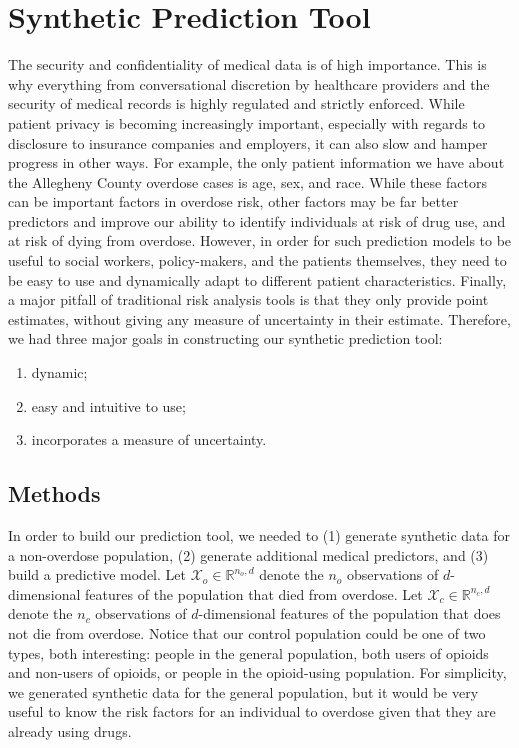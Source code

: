 \documentclass{article}
\begin{document}
\section{Synthetic Prediction Tool}
The security and confidentiality of medical data is of high importance. This is why everything from conversational discretion by healthcare providers and the security of medical records is highly regulated and strictly enforced. While patient privacy is becoming increasingly important, especially with regards to disclosure to insurance companies and employers, it can also slow and hamper progress in other ways. For example, the only patient information we have about the Allegheny County overdose cases is age, sex, and race. While these factors can be important factors in overdose risk, other factors may be far better predictors and improve our ability to identify individuals at risk of drug use, and at risk of dying from overdose. However, in order for such prediction models to be useful to social workers, policy-makers, and the patients themselves, they need to be easy to use and dynamically adapt to different patient characteristics. Finally, a major pitfall of traditional risk analysis tools is that they only provide point estimates, without giving any measure of uncertainty in their estimate. Therefore, we had three major goals in constructing our synthetic prediction tool:
\begin{enumerate}
\item dynamic;
\item easy and intuitive to use;
\item incorporates a measure of uncertainty.
\end{enumerate}

\subsection{Methods}
In order to build our prediction tool, we needed to (1) generate synthetic data for a non-overdose population, (2) generate additional medical predictors, and (3) build a predictive model. Let $\mathcal{X}_o \in \mathbb{R}^{n_o,d}$ denote the $n_o$ observations of $d$-dimensional features of the population that died from overdose. Let $\mathcal{X}_c \in \mathbb{R}^{n_c,d}$ denote the $n_c$ observations of $d$-dimensional features of the population that does not die from overdose. Notice that our control population could be one of two types, both interesting: people in the general population, both users of opioids and non-users of opioids, or people in the opioid-using population. For simplicity, we generated synthetic data for the general population, but it would be very useful to know the risk factors for an individual to overdose given that they are already using drugs.
\end{document}
